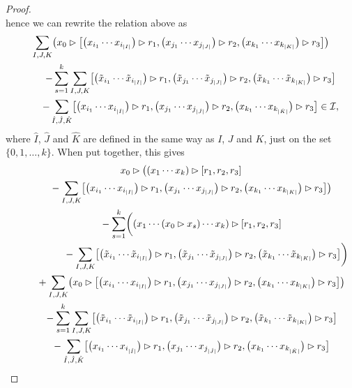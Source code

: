 \documentclass[pdftex]{sigma}
\numberwithin{equation}{section}
\begin{document}
\begin{proof}
\[\]
hence we can rewrite the relation above as
\begin{gather*}
 \sum_{I,J,K} \bigl( x_0 \rhd \bigl[\bigl(x_{i_1} \cdots x_{i_{|I|}}\bigr) \rhd r_1, \bigl(x_{j_1} \cdots x_{j_{|J|}}\bigr) \rhd r_2, \bigl(x_{k_1} \cdots x_{k_{|K|}}\bigr) \rhd r_3\bigr] \bigr)\\
 \qquad - \sum_{s=1}^k \sum_{I,J,K} \bigl[\bigl(\Tilde{x}_{i_1} \cdots \Tilde{x}_{i_{|I|}}\bigr) \rhd r_1, \bigl(\Tilde{x}_{j_1} \cdots \Tilde{x}_{j_{|J|}}\bigr) \rhd r_2, \bigl(\Tilde{x}_{k_1} \cdots \Tilde{x}_{k_{|K|}}\bigr) \rhd r_3\bigr] \\
 \qquad - \sum_{\hat{I},\hat{J},\hat{K}} \bigl[\bigl(x_{i_1} \cdots x_{i_{|\hat{I}|}}\bigr) \rhd r_1, \bigl(x_{j_1} \cdots x_{j_{|\hat{J}|}}\bigr) \rhd r_2, \bigl(x_{k_1} \cdots x_{k_{|\hat{K}|}}\bigr) \rhd r_3\bigr] \in \mathcal{I},
\end{gather*}
where $\hat{I}$, $\hat{J}$ and $\hat{K}$ are defined in the same way as $I$, $J$ and $K$, just on the set $\{0, 1, \dots ,k \}$. When put together, this gives
\begin{gather*}
 x_0 \rhd \bigl( (x_1 \cdots x_k) \rhd [r_1, r_2, r_3] \\
 \qquad {}- \sum_{I,J,K} \bigl[\bigl(x_{i_1} \cdots x_{i_{|I|}}\bigr) \rhd r_1, \bigl(x_{j_1} \cdots x_{j_{|J|}}\bigr) \rhd r_2, \bigl(x_{k_1} \cdots x_{k_{|K|}}\bigr) \rhd r_3\bigr] \bigr) \\
 \qquad {}- \sum_{s=1}^k \biggl( (x_1 \cdots (x_0 \rhd x_s) \cdots x_k) \rhd [r_1, r_2, r_3] \\
 \qquad {}\hphantom{- \sum_{s=1}^k \biggl(}{}- \sum_{I,J,K} \bigl[\bigl(\Tilde{x}_{i_1} \cdots \Tilde{x}_{i_{|I|}}\bigr) \rhd r_1, \bigl(\Tilde{x}_{j_1} \cdots \Tilde{x}_{j_{|J|}}\bigr) \rhd r_2, \bigl(\Tilde{x}_{k_1} \cdots \Tilde{x}_{k_{|K|}}\bigr) \rhd r_3\bigr] \biggr) \\
 \qquad {}+ \sum_{I,J,K} \bigl( x_0 \rhd \bigl[\bigl(x_{i_1} \cdots x_{i_{|I|}}\bigr) \rhd r_1, \bigl(x_{j_1} \cdots x_{j_{|J|}}\bigr) \rhd r_2, \bigl(x_{k_1} \cdots x_{k_{|K|}}\bigr) \rhd r_3\bigr] \bigr)\\
 \qquad {}- \sum_{s=1}^k \sum_{I,J,K} \bigl[\bigl(\Tilde{x}_{i_1} \cdots \Tilde{x}_{i_{|I|}}\bigr) \rhd r_1, \bigl(\Tilde{x}_{j_1} \cdots \Tilde{x}_{j_{|J|}}\bigr) \rhd r_2, \bigl(\Tilde{x}_{k_1} \cdots \Tilde{x}_{k_{|K|}}\bigr) \rhd r_3\bigr] \\
 \qquad {}- \sum_{\hat{I},\hat{J},\hat{K}} \bigl[\bigl(x_{i_1} \cdots x_{i_{|\hat{I}|}}\bigr) \rhd r_1, \bigl(x_{j_1} \cdots x_{j_{|\hat{J}|}}\bigr) \rhd r_2, \bigl(x_{k_1} \cdots x_{k_{|\hat{K}|}}\bigr) \rhd r_3\bigr] \\

\end{gather*}
\end{proof}
\end{document}
